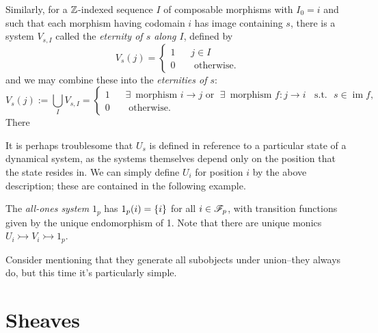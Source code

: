 \documentclass{amsart}
\begin{document}
\begin{example}
  Similarly, for a $\mathbb{Z}$-indexed sequence $I$ of composable morphisms with $I_0 = i$ and such that each morphism having codomain $i$ has image containing $s$, there is a system $V_{s,I}$ called the \emph{eternity of $s$ along $I$}, defined by
  \[
    V_s(j) = \begin{cases}
      1 & \;\;\; j \in I\\
      0 & \;\;\; \text{ otherwise.}
    \end{cases}
  \]
  and we may combine these into the \emph{eternities of $s$}: 
  \[
    V_s(j) := \bigcup_{I} V_{s,I} = \begin{cases}
      1 & \;\;\; \exists \, \text{ morphism } i \rightarrow j \text{ or } \; \exists \, \text{ morphism } f:j \rightarrow i \;\; \text{ s.t. } \,\, s \in \operatorname{im} f,\\
      0 & \;\;\; \text{ otherwise.}
    \end{cases}
  \]
  There 
\end{example}

It is perhaps troublesome that $U_s$ is defined in reference to a particular state of a dynamical system, as the systems themselves depend only on the position that the state resides in.
We can simply define $U_i$ for position $i$ by the above description;
these are contained in the following example.
\begin{example}
  The \emph{all-ones system} $1_p$ has $1_p(i) = \left\{ i \right\}$ for all $i \in \mathscr{F}_p$, with transition functions given by the unique endomorphism of 1.
  Note that there are unique monics $U_i \rightarrowtail V_i \rightarrowtail 1_p$.
  
  {\color{magenta} Consider mentioning that they generate all subobjects under union--they always do, but this time it's particularly simple.}
\end{example}


\section{Sheaves}\label{Sheaves section}
\end{document}
